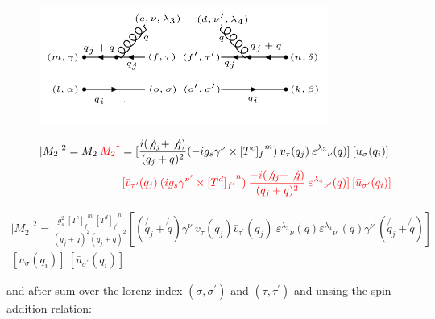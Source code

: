\begin{figure}[h!]
\centering
\includegraphics[width=0.85\textwidth]{images/qbargqMSquer.png}
\end{figure}

\begin{equation}
\begin{split}
|M_2|^2=M_2\:{\color[RGB]{255,0,0} {M_2}^{\dagger}} = [\frac{i(\not{q_j} + \not{q})}{(q_j + q)^2} (-ig_s \gamma^{\nu}\times {[T^c]_f}^m) \:{v}_{\tau}(q_j)\: {\varepsilon^{\lambda_3}}_{\nu} (q)]\: [{u}_{\sigma}(q_i)]\: \\
\quad\quad\quad\quad\quad\quad\quad\quad\:\:{\color[RGB]{255,0,0}[\bar{v}_{{\tau}^{\prime}}(q_j) \: (ig_s \gamma^{{\nu}^{\prime}}\times {[T^d]_{f^{\prime}}}^n) \: \frac{-i(\not{q_j} + \not{q})}{(q_j + q)^2} \: {\varepsilon^{\lambda_4}}_{{\nu}^{\prime}} (q)]\: [\bar{u}_{{\sigma}^{\prime}}(q_i)]}
\end{split}
\end{equation}


\begin{equation}
\begin{split}
|M_2|^2 =\frac{g_s^2 \: {[T^c]_f}^m \: {[T^d]_{f^{\prime}}}^n }{(q_j + q)^2 (q_j + q)^2} [(\not{q_j} + \not{q}) \gamma^{\nu}  \:{v}_{\tau}(q_j)\bar{v}_{{\tau}^{\prime}}(q_j)\: {\varepsilon^{\lambda_3}}_{\nu} (q){\varepsilon^{\lambda_4}}_{{\nu}^{\prime}}  (q) \gamma^{{\nu}^{\prime}}(\not{q_j} + \not{q})]\: \\
[{u}_{\sigma}(q_i) ]
\: [\bar{u}_{{\sigma}^{\prime}}(q_i)]
\end{split}
\end{equation}

and after sum over the lorenz index $({\sigma},{\sigma}^{\prime})$ and $({\tau},{\tau}^{\prime})$ and unsing the spin addition relation:
 
